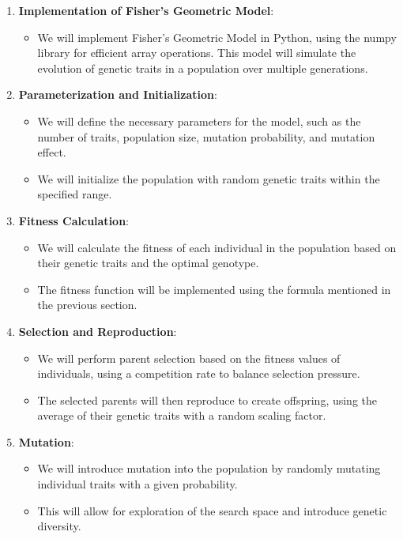 \documentclass{article}
\begin{document}
\begin{enumerate}
    \item \textbf{Implementation of Fisher's Geometric Model}:
    \begin{itemize}
        \item We will implement Fisher's Geometric Model in Python, using the numpy library for efficient array operations. This model will simulate the evolution of genetic traits in a population over multiple generations.
    \end{itemize}
    
    \item \textbf{Parameterization and Initialization}:
    \begin{itemize}
        \item We will define the necessary parameters for the model, such as the number of traits, population size, mutation probability, and mutation effect.
        \item We will initialize the population with random genetic traits within the specified range.
    \end{itemize}
    
    \item \textbf{Fitness Calculation}:
    \begin{itemize}
        \item We will calculate the fitness of each individual in the population based on their genetic traits and the optimal genotype.
        \item The fitness function will be implemented using the formula mentioned in the previous section.
    \end{itemize}
    
    \item \textbf{Selection and Reproduction}:
    \begin{itemize}
        \item We will perform parent selection based on the fitness values of individuals, using a competition rate to balance selection pressure.
        \item The selected parents will then reproduce to create offspring, using the average of their genetic traits with a random scaling factor.
    \end{itemize}
    
    \item \textbf{Mutation}:
    \begin{itemize}
        \item We will introduce mutation into the population by randomly mutating individual traits with a given probability.
        \item This will allow for exploration of the search space and introduce genetic diversity.
    \end{itemize}
    

\end{enumerate}
\end{document}
